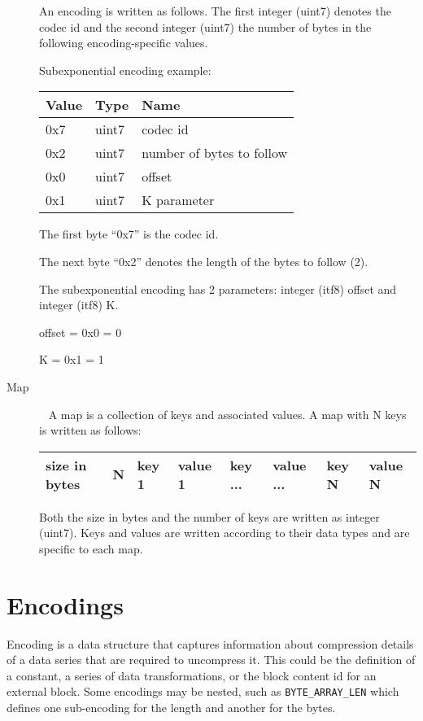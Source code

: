 \documentclass[a4paper]{article}
\begin{document}
\begin{description}
An encoding is written as follows. The first integer (uint7) denotes the codec id 
and the second integer (uint7) the number of bytes in the following encoding-specific 
values. 

Subexponential encoding example: 

\begin{tabular}{|l|l|l|}
\hline
\textbf{Value} & \textbf{Type} & \textbf{Name}\tabularnewline
\hline
0x7 & uint7 & codec id\tabularnewline
\hline
0x2 & uint7 & number of bytes to follow\tabularnewline
\hline
0x0 & uint7 & offset\tabularnewline
\hline
0x1 & uint7 & K parameter\tabularnewline
\hline
\end{tabular}

The first byte ``0x7'' is the codec id. 

The next byte ``0x2'' denotes the length of the bytes to follow (2). 

The subexponential encoding has 2 parameters: integer (itf8) offset and integer (itf8) K.

offset = 0x0 = 0

K = 0x1 = 1


\item[{Map}]\ \newline
A map is a collection of keys and associated values. A map with N keys is written 
as follows: 

\begin{tabular}{|l|l|l|l|l|l|l|l|}
\hline
size in bytes & N & key 1 & value 1 & key ... & value ... & key N & value N\tabularnewline
\hline
\end{tabular}

Both the size in bytes and the number of keys are written as integer (uint7). Keys 
and values are written according to their data types and are specific to each map.

\end{description}


\section{\textbf{Encodings }}

Encoding is a data structure that captures information about compression details 
of a data series that are required to uncompress it.  This could be
the definition of a constant, a series of data transformations, or the
block content id for an external block.  Some encodings may be nested,
such as \texttt{BYTE\_ARRAY\_LEN} which defines one sub-encoding for the
length and another for the bytes.
\end{document}
